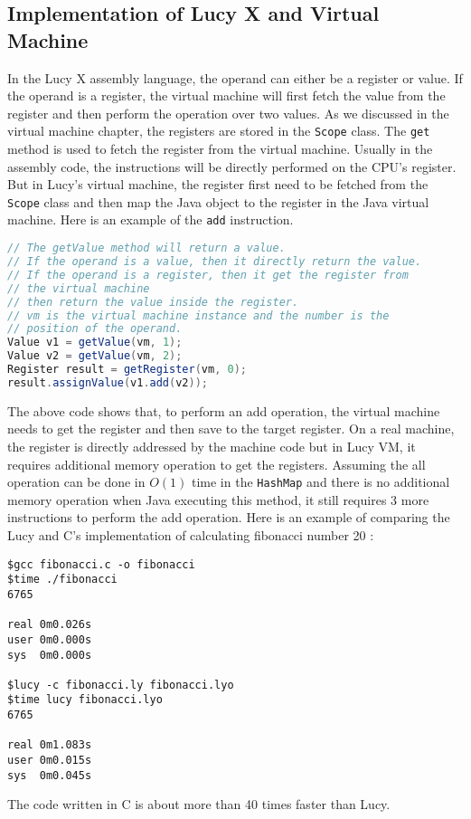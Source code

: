 \subsection{Implementation of Lucy X and Virtual Machine}
In the Lucy X assembly language, the operand can either be a register or value. If the operand is a register, the virtual machine will first fetch the value from the register and then perform the operation over two values. As we discussed in the virtual machine chapter, the registers are stored in the \texttt{Scope} class. The \texttt{get} method is used to fetch the register from the virtual machine. Usually in the assembly code, the instructions will be directly performed on the CPU's register. But in Lucy's virtual machine, the register first need to be fetched from the \texttt{Scope} class and then map the Java object to the register in the Java virtual machine. Here is an example of the \texttt{add} instruction.
\begin{lstlisting}[language=Java]
// The getValue method will return a value.
// If the operand is a value, then it directly return the value.
// If the operand is a register, then it get the register from
// the virtual machine
// then return the value inside the register.
// vm is the virtual machine instance and the number is the
// position of the operand.
Value v1 = getValue(vm, 1);
Value v2 = getValue(vm, 2);
Register result = getRegister(vm, 0);
result.assignValue(v1.add(v2));
\end{lstlisting}
The above code shows that, to perform an add operation, the virtual machine needs to get the register and then save to the target register. On a real machine, the register is directly addressed by the machine code but in Lucy VM, it requires additional memory operation to get the registers. Assuming the all operation can be done in $O(1)$ time in the \texttt{HashMap} and there is no additional memory operation when Java executing this method, it still requires 3 more instructions to perform the add operation. Here is an example of comparing the Lucy and C's implementation of calculating fibonacci number 20 :
\begin{lstlisting}
$gcc fibonacci.c -o fibonacci
$time ./fibonacci
6765

real 0m0.026s
user 0m0.000s
sys  0m0.000s

$lucy -c fibonacci.ly fibonacci.lyo
$time lucy fibonacci.lyo
6765

real 0m1.083s
user 0m0.015s
sys  0m0.045s
\end{lstlisting}
The code written in C is about more than 40 times faster than Lucy.

